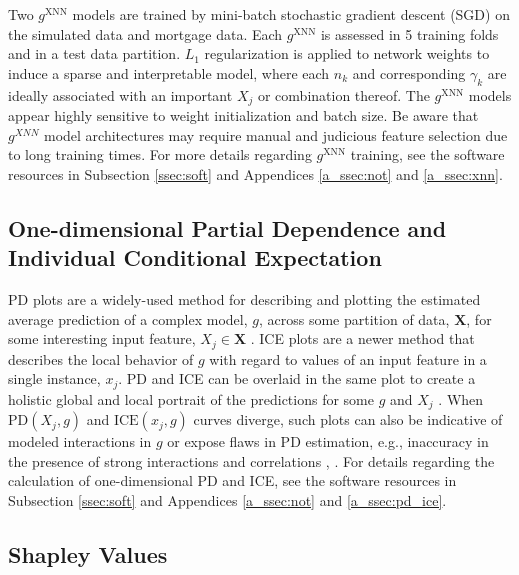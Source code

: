 \documentclass[information,article,submit,moreauthors,pdftex]{definitions/mdpi}
\begin{document}
Two $g^\text{XNN}$ models are trained by mini-batch stochastic gradient descent (SGD) on the simulated data and mortgage data. Each $g^\text{XNN}$ is assessed in 5 training folds and in a test data partition. $L_1$ regularization is applied to network weights to induce a sparse and interpretable model, where each $n_k$ and corresponding $\gamma_k$ are ideally associated with an important $X_j$ or combination thereof. The $g^\text{XNN}$ models appear highly sensitive to weight initialization and batch size. Be aware that $g^{XNN}$ model architectures may require manual and judicious feature selection due to long training times. For more details regarding $g^\text{XNN}$ training, see the software resources in Subsection \ref{ssec:soft} and Appendices  \ref{a_ssec:not} and \ref{a_ssec:xnn}.

\subsection{One-dimensional Partial Dependence and Individual Conditional Expectation}\label{ssec:pd_ice}

PD plots are a widely-used method for describing and plotting the estimated average prediction of a complex model, $g$, across some partition of data, $\mathbf{X}$, for some interesting input feature, $X_j \in \mathbf{X}$ \cite{esl}. ICE plots are a newer method that describes the local behavior of $g$ with regard to values of an input feature in a single instance, $x_j$. PD and ICE can be overlaid in the same plot to create a holistic global and local portrait of the predictions for some $g$ and $X_j$ \cite{ice_plots}. When $\text{PD}(X_j, g)$ and $\text{ICE}(x_j,  g)$ curves diverge, such plots can also be indicative of modeled interactions in $g$ or expose flaws in PD estimation, e.g., inaccuracy in the presence of strong interactions and correlations \cite{ice_plots}, \cite{ale_plot}.  For details regarding the calculation of one-dimensional PD and ICE, see the software resources in Subsection \ref{ssec:soft} and Appendices \ref{a_ssec:not} and \ref{a_ssec:pd_ice}.

\subsection{Shapley Values}\label{ssec:shap}
\end{document}
